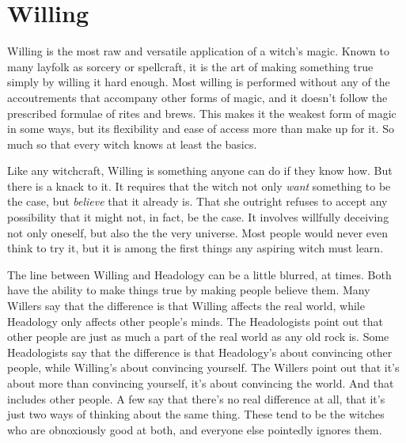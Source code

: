 \chapter{Willing}

Willing is the most raw and versatile application of a witch's magic.
Known to many layfolk as sorcery or spellcraft, it is the art of making something true simply by willing it hard enough.
Most willing is performed without any of the accoutrements that accompany other forms of magic, and it doesn't follow the prescribed formulae of rites and brews.
This makes it the weakest form of magic in some ways, but its flexibility and ease of access more than make up for it.
So much so that every witch knows at least the basics.

Like any witchcraft, Willing is something anyone can do if they know how.
But there is a knack to it.
It requires that the witch not only \emph{want} something to be the case, but \emph{believe} that it already is.
That she outright refuses to accept any possibility that it might not, in fact, be the case.
It involves willfully deceiving not only oneself, but also the the very universe.
Most people would never even think to try it, but it is among the first things any aspiring witch must learn.

The line between Willing and Headology can be a little blurred, at times.
Both have the ability to make things true by making people believe them.
Many Willers say that the difference is that Willing affects the real world, while Headology only affects other people's minds.
The Headologists point out that other people are just as much a part of the real world as any old rock is.
Some Headologists say that the difference is that Headology's about convincing other people, while Willing's about convincing yourself.
The Willers point out that it's about more than convincing yourself, it's about convincing the world.
And that includes other people.
A few say that there's no real difference at all, that it's just two ways of thinking about the same thing.
These tend to be the witches who are obnoxiously good at both, and everyone else pointedly ignores them.

